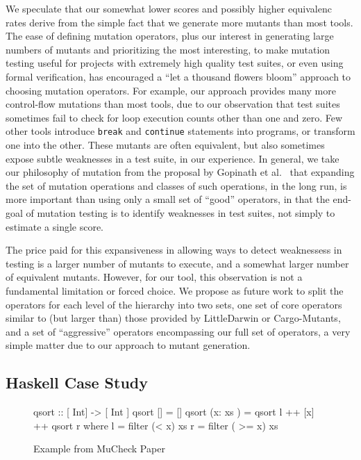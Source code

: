 \documentclass[sigconf,review, anonymous]{acmart}
\begin{document}
{We speculate that our somewhat lower scores and possibly higher
equivalenc rates derive from the simple fact that we generate more
mutants than most tools.  The ease of defining mutation operators,
plus our interest in generating large numbers of mutants and
prioritizing the most interesting, to make mutation testing useful for
projects with extremely high quality test suites, or even using formal
verification, has encouraged a ``let a thousand flowers bloom''
approach to choosing mutation operators.  For example, our approach
provides many more control-flow mutations than most tools, due to our
observation that test suites sometimes fail to check for loop
execution counts other than one and zero.  Few other tools introduce
{\tt break} and {\tt continue} statements into programs, or transform
one into the other.  These mutants are often equivalent, but also
sometimes expose subtle weaknesses in a test suite, in our
experience.  In general, we take our philosophy of mutation from the
proposal by Gopinath et al.~\cite{Limits,gopinath2017mutation} that
expanding the set of mutation operations and classes of such
operations, in the long run, is more important than using only a small
set of ``good'' operators, in that the end-goal of mutation testing is
to identify weaknesses in test suites, not simply to estimate a single score.

The price paid for this
expansiveness in allowing ways to detect weaknessess in testing is a
larger number of mutants to execute, and a somewhat larger number of
equivalent mutants.  However, for our tool, this observation is not a
fundamental limitation or forced choice.  We propose as future work to
split the operators for each level of the hierarchy into two sets, one
set of core operators similar to (but larger than) those provided by
LittleDarwin or Cargo-Mutants, and a set of ``aggressive'' operators
encompassing our full set of operators, a very simple matter due to
our approach to mutant generation.

\subsection{Haskell Case Study}

\begin{figure}

  \begin{code}
 qsort :: [ Int] -> [ Int ]
 qsort [] = []
 qsort (x: xs ) = qsort l ++ [x] ++ qsort r
     where l = filter (< x) xs
           r = filter ( >= x) xs
\end{code}
\caption{Example from MuCheck Paper}
\label{fig:haskell}


\end{figure}}
\end{document}

